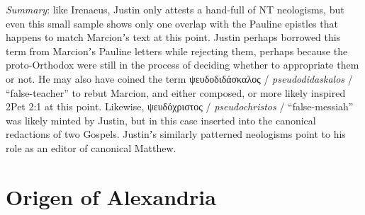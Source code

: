 \noindent{}\textit{Summary}: like Irenaeus, Justin only attests a hand-full of NT neologisms, %
but even this small sample shows only one overlap with the Pauline epistles %
that happens to match Marcionʼs text at this point. %
Justin perhaps borrowed this term from Marcionʼs Pauline letters while rejecting them, %
perhaps because the proto-Orthodox were still in the process of deciding whether to appropriate them or not. %
He may also have coined the term ψευδοδιδάσκαλος / \textit{pseudodidaskalos} / “false-teacher” %
to rebut Marcion, %
and either composed, or more likely inspired 2Pet 2:1 at this point. %
Likewise, ψευδόχριστος / \textit{pseudochristos} / “false-messiah” was likely minted by Justin, %
but in this case inserted into the canonical redactions of two Gospels. %
Justinʼs similarly patterned neologisms point to his role as an editor of canonical Matthew. \\[1mm] %

\section{Origen of Alexandria}

